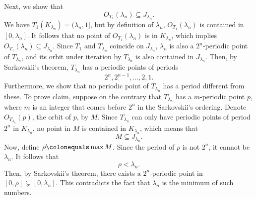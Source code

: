 \documentclass[10pt,twoside,draft]{book}
\begin{document}
\begin{example}
  Next, we show that 
  \begin{equation*}
    O_{T_1}(\lambda_n) \subseteq J_{\lambda_n}.
  \end{equation*}
We have $T_1(K_{\lambda_n}) = (\lambda_n, 1]$, but by definition of $\lambda_n$, $O_{T_1}(\lambda_n)$ is contained in $[0,\lambda_n]$.
It follows that no point of $O_{T_1}(\lambda_n)$ is in $K_{\lambda_n}$, which implies $O_{T_1}(\lambda_n) \subseteq J_{\lambda_n}$.
Since $T_1$ and $T_{\lambda_n}$ coincide on $J_{\lambda_n}$, $\lambda_n$ is also a $2^n$-periodic point of $T_{\lambda_n}$, and its orbit under iteration by $T_{\lambda_n}$ is also contained in $J_{\lambda_n}$.
Then, by Sarkovskii's theorem, $T_{\lambda_n}$ has a periodic points of periods
\begin{equation*}
  2^n, 2^{n-1}, \ldots, 2, 1.
\end{equation*}
Furthermore, we show that no periodic point of $T_{\lambda_n}$ has a period different from these.
To prove claim, suppose on the contrary that $T_{\lambda_n}$ has a $m$-periodic point $p$, where $m$ is an integer that comes before $2^n$ in the Sarkovskii's ordering.
Denote $O_{T_{\lambda_n}}(p)$, the orbit of $p$, by $M$.
Since $T_{\lambda_n}$ can only have periodic points of period $2^n$ in $K_{\lambda_n}$, no point in $M$ is contained in $K_{\lambda_n}$, which means that
\begin{equation*}
  M \subseteq J_{\lambda_n}.
\end{equation*}
Now, define $\rho \ceq \max M$.
Since the period of $\rho$ is not $2^n$, it cannot be $\lambda_n$.
It follows that
\begin{equation*}
  \rho < \lambda_n.
\end{equation*}
Then, by Sarkovskii's theorem, there exists a $2^n$-periodic point in $[0,\rho] \subsetneq [0, \lambda_n]$.
This contradicts the fact that $\lambda_n$ is the minimum of such numbers.


\end{example}
\end{document}
